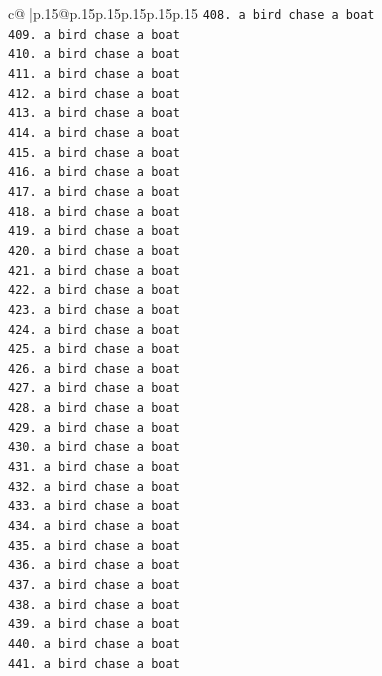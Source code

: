 \documentclass{article}
\begin{document}
{\begin{supertabular}{c@{$\;$}|p{.15\linewidth}@{}p{.15\linewidth}p{.15\linewidth}p{.15\linewidth}p{.15\linewidth}p{.15\linewidth}}
{{{\texttt{408. a bird chase a boat} \\
\texttt{409. a bird chase a boat} \\
\texttt{410. a bird chase a boat} \\
\texttt{411. a bird chase a boat} \\
\texttt{412. a bird chase a boat} \\
\texttt{413. a bird chase a boat} \\
\texttt{414. a bird chase a boat} \\
\texttt{415. a bird chase a boat} \\
\texttt{416. a bird chase a boat} \\
\texttt{417. a bird chase a boat} \\
\texttt{418. a bird chase a boat} \\
\texttt{419. a bird chase a boat} \\
\texttt{420. a bird chase a boat} \\
\texttt{421. a bird chase a boat} \\
\texttt{422. a bird chase a boat} \\
\texttt{423. a bird chase a boat} \\
\texttt{424. a bird chase a boat} \\
\texttt{425. a bird chase a boat} \\
\texttt{426. a bird chase a boat} \\
\texttt{427. a bird chase a boat} \\
\texttt{428. a bird chase a boat} \\
\texttt{429. a bird chase a boat} \\
\texttt{430. a bird chase a boat} \\
\texttt{431. a bird chase a boat} \\
\texttt{432. a bird chase a boat} \\
\texttt{433. a bird chase a boat} \\
\texttt{434. a bird chase a boat} \\
\texttt{435. a bird chase a boat} \\
\texttt{436. a bird chase a boat} \\
\texttt{437. a bird chase a boat} \\
\texttt{438. a bird chase a boat} \\
\texttt{439. a bird chase a boat} \\
\texttt{440. a bird chase a boat} \\
\texttt{441. a bird chase a boat} \\
}}}
\end{supertabular}}
\end{document}
